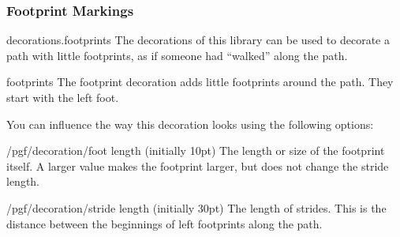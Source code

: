 \subsubsection{Footprint Markings}

\begin{pgflibrary}{decorations.footprints}
    The decorations of this library can be used to decorate a path with little
    footprints, as if someone had ``walked'' along the path.
\end{pgflibrary}

\begin{decoration}{footprints}
    The footprint decoration adds little footprints around the path. They start
    with the left foot.
\begin{codeexample}[preamble={\usetikzlibrary{decorations.footprints}}]
\end{codeexample}
    You can influence the way this decoration looks using the following
    options:
    \begin{key}{/pgf/decoration/foot length (initially 10pt)}
        The length or size of the footprint itself. A larger value makes the
        footprint larger, but does not change the stride length.
\begin{codeexample}[preamble={\usetikzlibrary{decorations.footprints}}]
\end{codeexample}
    \end{key}
    \begin{key}{/pgf/decoration/stride length (initially 30pt)}
        The length of strides. This is the distance between the beginnings of
        left footprints along the path.
\begin{codeexample}[preamble={\usetikzlibrary{decorations.footprints}}]
\end{codeexample}
    \end{key}

\end{decoration}
